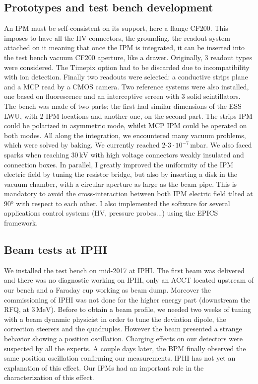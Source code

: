 \subsection*{Prototypes and test bench development}

An IPM must be self-consistent on its support, here a flange CF200. This imposes to have all the HV connectors, the grounding, the readout system attached on it meaning that once the IPM is integrated, it can be inserted into the test bench vacuum CF200 aperture, like a drawer. Originally, 3 readout types were considered. The Timepix option had to be discarded due to incompatibility with ion detection. Finally two readouts were selected: a conductive strips plane and a MCP read by a CMOS camera. Two reference systems were also installed, one based on fluorescence and an interceptive screen with 3 solid scintillators. The bench was made of two parts; the first had similar dimensions of the ESS LWU, with 2 IPM locations and another one, on the second part.
The strips IPM could be polarized in asymmetric mode, whilst MCP IPM could be operated on both modes. All along the integration, we encountered many vacuum problems, which were solved by baking. We currently reached $2$-$3 \cdot 10^{-7}\,\mathrm{mbar}$.
We also faced sparks when reaching $30\,\mathrm{kV}$ with high voltage connectors weakly insulated and connection boxes. In parallel, I greatly improved the uniformity of the IPM electric field by tuning the resistor bridge, but also by inserting a disk in the vacuum chamber, with a circular aperture as large as the beam pipe. This is mandatory to avoid the cross-interaction between both IPM electric field tilted at $90\mathrm{^{o}}$ with respect to each other.
I also implemented the software for several applications control systems (HV, pressure probes...) using the EPICS framework.

\subsection*{Beam tests at IPHI}

We installed the test bench on mid-2017 at IPHI. The first beam was delivered and there was no diagnostic working on IPHI, only an ACCT located upstream of our bench and a Faraday cup working as beam dump. Moreover the commissioning of IPHI was not done for the higher energy part (downstream the RFQ, at $3\,\mathrm{MeV}$). Before to obtain a beam profile, we needed two weeks of tuning with a beam dynamic physicist in order to tune the deviation dipole, the correction steerers and the quadruples. However the beam presented a strange behavior showing a position oscillation. Charging effects on our detectors were suspected by all the experts. A couple days later, the BPM finally observed the same position oscillation confirming our measurements. IPHI has not yet an explanation of this effect. Our IPMs had an important role in the characterization of this effect.

